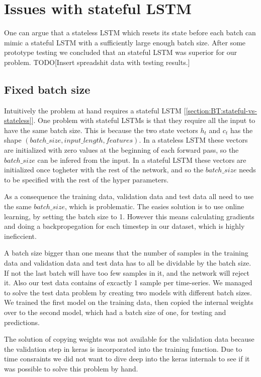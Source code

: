 
\section{Issues with stateful LSTM}
\label{section:Method:issues-with-stateful-lstm}
One can argue that a stateless LSTM which resets its state before each batch
can mimic a stateful LSTM with a sufficiently large enough batch size.
After some prototype testing we concluded that an stateful LSTM
was superior for our problem.
TODO[Insert spreadshit data with testing results.]

\subsection{Fixed batch size}
\label{section:Method:issues-lstm:fixed-batch-size}
Intuitively the problem at hand requires a stateful LSTM [\cref{section:BT:stateful-vs-stateless}].
One problem with stateful LSTMs is that they require all the input to have the same
batch size.
This is because the two state vectors $h_t$ and $c_t$ has the shape
$(batch\_size, input\_length, features)$. In a stateless LSTM these
vectors are initialized with zero values at the beginning of each forward pass,
so the $batch\_size$ can be infered from the input.
In a stateful LSTM these vectors are initialized once togheter with the rest
of the network, and so the $batch\_size$ needs to be specified with
the rest of the hyper parameters.

As a consequence the training data, validation data and test data all
need to use the same $batch\_size$, which is problematic.
The easies solution is to use online learning, by setting the batch size to 1.
However this means calculating gradients and doing a backpropegation for each
timestep in our dataset, which is highly ineficcient.

A batch size bigger than one means that the number of samples in
the training data and validation data and test data has to all be
dividable by the batch size. If not the last batch will have too few samples in it,
and the network will reject it.
Also our test data contains of excactly 1 sample per time-series.
We managed to solve the test data problem by creating two models with
different batch sizes. We trained the first model on the training data,
then copied the internal weights over to the second model, which had a
batch size of one, for testing and
predictions.

The solution of copying weights was not available for the validation data
because the validation step in keras is incorporated into the training function.
Due to time consraints we did not want to dive deep into the keras internals
to see if it was possible to solve this problem by hand.

